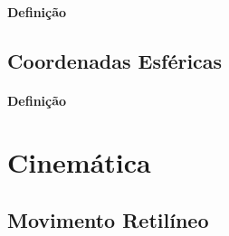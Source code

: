 \documentclass{article}
\begin{document}
            \paragraph{Definição}

        \subsection{Coordenadas Esféricas}
            \paragraph{Definição}
\newpage

    \section{Cinemática}
        \subsection{Movimento Retilíneo}
\end{document}

